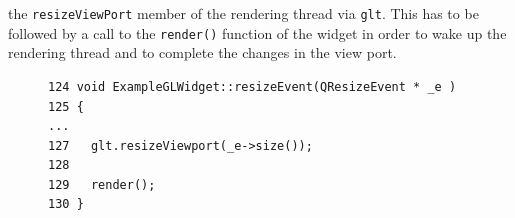 \documentclass[jou,noapacite]{apa}
\begin{document}
the \lstinline|resizeViewPort| member of the rendering thread
via \lstinline|glt|.
%
This has to be followed by a call to the \lstinline|render()| function of the
widget in order to wake up the rendering thread and to complete the changes in
the view port.
%
\begin{figure}[h]
\begin{lstlisting}[basicstyle=\scriptsize]
124 void ExampleGLWidget::resizeEvent(QResizeEvent * _e )
125 {
...
127   glt.resizeViewport(_e->size());
128
129   render();
130 }
\end{lstlisting}
\end{figure}
\end{document}
